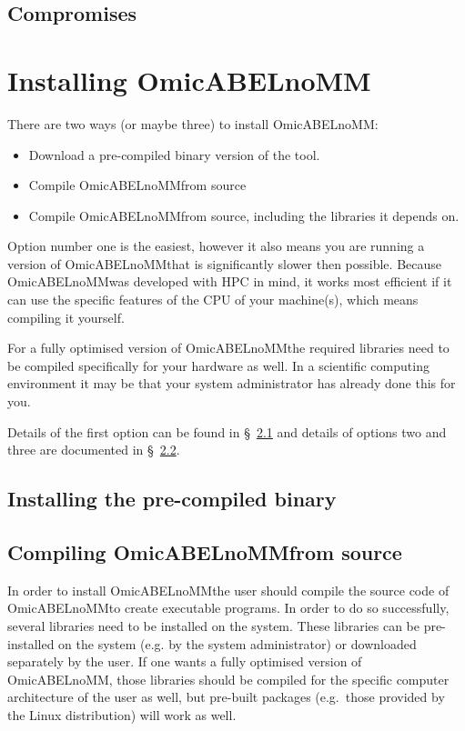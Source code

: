 \documentclass{report}
\newcommand{\eg}{e.g.~}
\newcommand{\oanomm}{OmicABELnoMM}
\begin{document}
\section{Compromises}

\chapter{Installing \oanomm}

There are two ways (or maybe three) to install \oanomm:
\begin{itemize}
\item Download a pre-compiled binary version of the tool.
\item Compile \oanomm from source
\item Compile \oanomm from source, including the libraries it depends
  on.
\end{itemize}
Option number one is the easiest, however it also means you are
running a version of \oanomm that is significantly slower then
possible. Because \oanomm was developed with \ac{HPC} in mind, it
works most efficient if it can use the specific features of the
\ac{CPU} of your machine(s), which means compiling it yourself.

For a fully optimised version of \oanomm the required libraries need
to be compiled specifically for your hardware as well. In a scientific
computing environment it may be that your system administrator has
already done this for you.

Details of the first option can be found in \S~\ref{sec:binaryinstall}
and details of options two and three are documented in
\S~\ref{sec:compile}.

\section{Installing the pre-compiled binary}
\label{sec:binaryinstall}


\section{Compiling \oanomm from source}
\label{sec:compile}
In order to install \oanomm the user should compile the source code of
\oanomm to create executable programs. In order to do so successfully,
several libraries need to be installed on the system.  These libraries
can be pre-installed on the system (e.g. by the system administrator)
or downloaded separately by the user. If one wants a fully optimised
version of \oanomm, those libraries should be compiled for the
specific computer architecture of the user as well, but pre-built
packages (\eg those provided by the Linux distribution) will work as
well.
\end{document}
